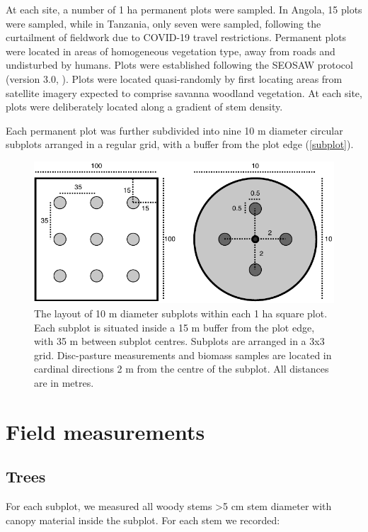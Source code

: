 \documentclass[11pt,a4paper]{article}
\begin{document}


At each site, a number of 1 ha permanent plots were sampled. In Angola, 15 plots were sampled, while in Tanzania, only seven were sampled, following the curtailment of fieldwork due to COVID-19 travel restrictions. Permanent plots were located in areas of homogeneous vegetation type, away from roads and undisturbed by humans. Plots were established following the SEOSAW protocol (version 3.0, \citealt{SEOSAW2020}). Plots were located quasi-randomly by first locating areas from satellite imagery expected to comprise savanna woodland vegetation. At each site, plots were deliberately located along a gradient of stem density.

Each permanent plot was further subdivided into nine 10 m diameter circular subplots arranged in a regular grid, with a buffer from the plot edge (\autoref{subplot}).

\begin{figure}[H]
\centering
	\includegraphics[width=\textwidth]{subplot}
	\caption{The layout of 10 m diameter subplots within each 1 ha square plot. Each subplot is situated inside a 15 m buffer from the plot edge, with 35 m between subplot centres. Subplots are arranged in a 3x3 grid. Disc-pasture measurements and biomass samples are located in cardinal directions 2 m from the centre of the subplot. All distances are in metres.}
	\label{subplot}
\end{figure}

\section{Field measurements}

\subsection{Trees}

For each subplot, we measured all woody stems >5 cm stem diameter with canopy material inside the subplot. For each stem we recorded:
\end{document}
